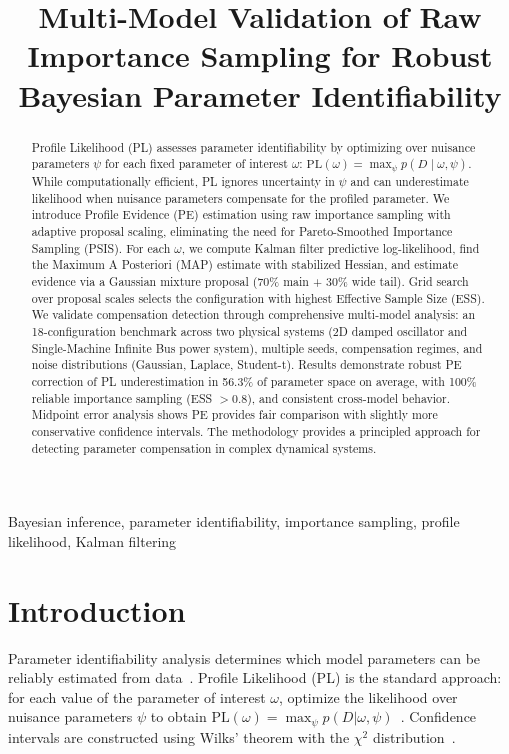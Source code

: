 \documentclass[conference]{IEEEtran}
\title{Multi-Model Validation of Raw Importance Sampling for Robust Bayesian Parameter Identifiability}
\author{\IEEEauthorblockN{Michael Strojny and Zeb Tate}
\IEEEauthorblockA{\textit{Department of Electrical and Computer Engineering} \\
\textit{University of Toronto}\\
Toronto, Canada \\
\href{mailto:michael.strojny@mail.utoronto.ca}{michael.strojny@mail.utoronto.ca}, \href{mailto:zeb.tate@utoronto.ca}{zeb.tate@utoronto.ca}}
}
\begin{document}
\maketitle

\begin{abstract}
Profile Likelihood (PL) assesses parameter identifiability by optimizing over nuisance parameters $\psi$ for each fixed parameter of interest $\omega$: $\mathrm{PL}(\omega)=\max_{\psi} p(D\mid\omega,\psi)$. While computationally efficient, PL ignores uncertainty in $\psi$ and can underestimate likelihood when nuisance parameters compensate for the profiled parameter. We introduce Profile Evidence (PE) estimation using raw importance sampling with adaptive proposal scaling, eliminating the need for Pareto-Smoothed Importance Sampling (PSIS). For each $\omega$, we compute Kalman filter predictive log-likelihood, find the Maximum A Posteriori (MAP) estimate with stabilized Hessian, and estimate evidence via a Gaussian mixture proposal (70\% main + 30\% wide tail). Grid search over proposal scales selects the configuration with highest Effective Sample Size (ESS). We validate compensation detection through comprehensive multi-model analysis: an 18-configuration benchmark across two physical systems (2D damped oscillator and Single-Machine Infinite Bus power system), multiple seeds, compensation regimes, and noise distributions (Gaussian, Laplace, Student-t). Results demonstrate robust PE correction of PL underestimation in 56.3\% of parameter space on average, with 100\% reliable importance sampling (ESS $> 0.8$), and consistent cross-model behavior. Midpoint error analysis shows PE provides fair comparison with slightly more conservative confidence intervals. The methodology provides a principled approach for detecting parameter compensation in complex dynamical systems.
\end{abstract}

\begin{IEEEkeywords}
Bayesian inference, parameter identifiability, importance sampling, profile likelihood, Kalman filtering
\end{IEEEkeywords}

\section{Introduction}

Parameter identifiability analysis determines which model parameters can be reliably estimated from data~\cite{raue2009}. Profile Likelihood (PL) is the standard approach: for each value of the parameter of interest $\omega$, optimize the likelihood over nuisance parameters $\psi$ to obtain $\mathrm{PL}(\omega) = \max_{\psi} p(D|\omega,\psi)$~\cite{venzon1988}. Confidence intervals are constructed using Wilks' theorem with the $\chi^2$ distribution~\cite{wilks1938}.
\end{document}
